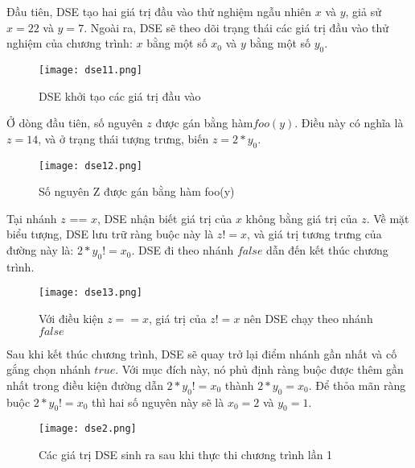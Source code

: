 Đầu tiên, DSE tạo hai giá trị đầu vào thử nghiệm ngẫu nhiên $x$ và $y$, giả sử $x = 22$ và $y = 7$. Ngoài ra, DSE sẽ theo dõi trạng thái các giá trị đầu vào thử nghiệm của chương trình: $x$ bằng một số $x_{0}$ và $y$ bằng một số $y_{0}$.
\begin{center}
	\begin{figure}[H]
		\begin{center}
			\texttt{[image: dse11.png]}
		\end{center}
		\caption{DSE khởi tạo các giá trị đầu vào}
		\label{dse11}
	\end{figure}
\end{center}
Ở dòng đầu tiên, số nguyên $z$ được gán bằng hàm$foo(y)$. Điều này có nghĩa là $z = 14$, và ở trạng thái tượng trưng, biến $ z = 2*y_{0} $. 
\begin{center}
	\begin{figure}[H]
		\begin{center}
			\texttt{[image: dse12.png]}
		\end{center}
		\caption{Số nguyên Z được gán bằng hàm foo(y)}
		\label{dse12}
	\end{figure}
\end{center}

Tại nhánh $z$ == $x$, DSE nhận biết giá trị của $x$ không bằng giá trị của $z$. Về mặt biểu tượng, DSE lưu trữ ràng buộc này là $z != x$, và giá trị tương trưng của đường này là: $ 2*y_{0} != x_{0} $. DSE đi theo nhánh $false$ dẫn đến kết thúc chương trình.
\begin{center}
	\begin{figure}[H]
		\begin{center}
			\texttt{[image: dse13.png]}
		\end{center}
		\caption{Với điều kiện $z == x$, giá trị của  $z != x$ nên DSE chạy theo nhánh $false$  }
		\label{dse13}
	\end{figure}
\end{center}

Sau khi kết thúc chương trình, DSE sẽ quay trở lại điểm nhánh gần nhất và cố gắng chọn nhánh $true$. Với mục đích này, nó phủ định ràng buộc được thêm gần nhất trong điều kiện đường dẫn $2*y_{0} != x_{0}$ thành $2*y_{0} = x_{0}$. Để thỏa mãn ràng buộc  $2*y_{0} != x_{0}$  thì hai số nguyên này sẽ là $x_{0} = 2$ và $ y_{0} = 1$.

\begin{center}
	\begin{figure}[H]
		\begin{center}
			\texttt{[image: dse2.png]}
		\end{center}
		\caption{Các giá trị DSE sinh ra sau khi thực thi chương trình lần 1}
		\label{dse2}
	\end{figure}
\end{center}

